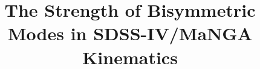 

%

\newcommand{\note}[2][todo]{{\color{#1}[[{\bf #2}]]}}

\received{}
\revised{}
\accepted{}






\title{The Strength of Bisymmetric Modes in SDSS-IV/MaNGA Kinematics}


